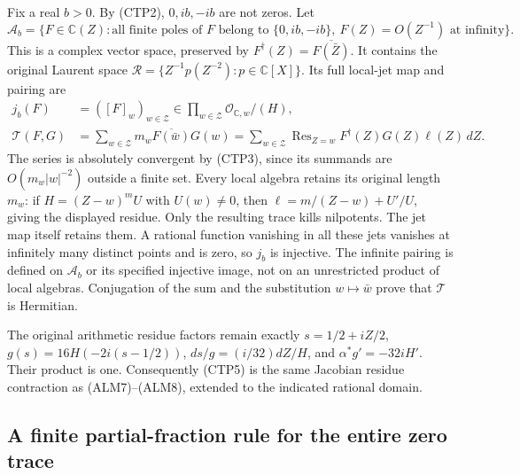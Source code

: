 Fix a real $b>0$. By (CTP2), $0,ib,-ib$ are not zeros. Let
\begin{equation}\tag{CTP4}
 \mathscr A_b=\{F\in\mathbb C(Z):
   \text{all finite poles of }F\text{ belong to }\{0,ib,-ib\},
   \ F(Z)=O(Z^{-1})\text{ at infinity}\}.
\end{equation}
This is a complex vector space, preserved by
$F^\dagger(Z)=\overline{F(\bar Z)}$. It contains the original Laurent
space $\mathscr R=\{Z^{-1}p(Z^{-2}):p\in\mathbb C[X]\}$.
Its full local-jet map and pairing are
\begin{equation}\tag{CTP5}
\begin{split}
 j_b(F)&=([F]_w)_{w\in\mathcal Z}
   \in\prod_{w\in\mathcal Z}\mathcal O_{\mathbb C,w}/(H),\\
 \mathcal T(F,G)&=\sum_{w\in\mathcal Z}m_w
                  \overline{F(\bar w)}G(w)
  =\sum_{w\in\mathcal Z}\operatorname{Res}_{Z=w}
          F^\dagger(Z)G(Z)\ell(Z)\,dZ.
\end{split}
\end{equation}
The series is absolutely convergent by (CTP3), since its summands
are $O(m_w|w|^{-2})$ outside a finite set. Every local algebra retains
its original length $m_w$: if $H=(Z-w)^mU$ with $U(w)\ne0$, then
$\ell=m/(Z-w)+U'/U$, giving the displayed residue. Only the resulting
trace kills nilpotents. The jet map itself retains them. A rational
function vanishing in all these jets vanishes at infinitely many
distinct points and is zero, so $j_b$ is injective. The infinite
pairing is defined on $\mathscr A_b$ or its specified injective image,
not on an unrestricted product of local algebras. Conjugation of the
sum and the substitution $w\mapsto\bar w$ prove that $\mathcal T$
is Hermitian.

The original arithmetic residue factors remain exactly
$s=1/2+iZ/2$, $g(s)=16H(-2i(s-1/2))$,
$ds/g=(i/32)dZ/H$, and $\alpha^*g'=-32iH'$. Their product is one.
Consequently (CTP5) is the same Jacobian residue contraction as
(ALM7)--(ALM8), extended to the indicated rational domain.

\subsection{A finite partial-fraction rule for the entire zero trace}

